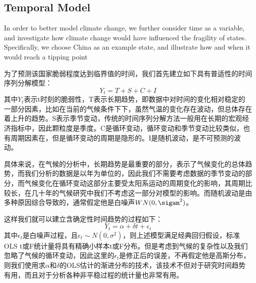 \subsection{Temporal Model}
In order to better model climate change, we further consider time as a variable, and investigate how climate change would have influenced the fragility of states. Specifically, we choose China as an example state, and illustrate how and when it would reach a tipping point 

为了预测该国家脆弱程度达到临界值的时间，我们首先建立如下具有普适性的时间序列分解模型：
$$Y_t=T+S+C+I$$
其中$Y_t$表示t时刻的脆弱性，T表示长期趋势，即数据中对时间的变化相对稳定的一部分因素，比如在当前的气候条件下下，虽然气温的变化存在波动，但总体存在着上升的趋势。S表示季节变动，传统的时间序列分解方法一般用在长期的宏观经济指标中，因此颗粒度是季度。C是循环变动，循环变动和季节变动比较类似，也有周期因素在，但是循环变动的周期是隐形的。I是随机波动，是不可预测的波动。

具体来说，在气候的分析中，长期趋势是最重要的部分，表示了气候变化的总体趋势，而我们分析的数据是以年为单位的，因此我们不需要考虑数据的季节变动的部分，而气候变化在循环变动这部分主要受太阳系运动的周期变化的影响，其周期比较长，在几十年的气候研究中我们不考虑这一部分对模型的影响。而随机波动是由多种原因综合导致的，通常假定他是白噪声$WN(0,\sigam^2)$。

这样我们就可以建立含确定性时间趋势的过程如下：
$$Y_t=\alpha + \delta t + \epsilon _t$$
其中$\epsilon_t$是白噪声过程，且$\epsilon_t \sim N(0,\sigma ^2)$，则上述模型满足经典回归假设，标准OLS t或F统计量将具有精确小样本t或F分布。但是考虑到气候的复杂性以及我们忽略了气候的循环变动，因此这里的$\epsilon_t$是修正后的误差，不再假定他是高斯分布，则我们使用求$\alpha$和$\delta$的OLS估计的渐进分布的技术，该技术不但对于研究时间趋势有用，而且对于分析各种非平稳过程的统计量也非常有用。